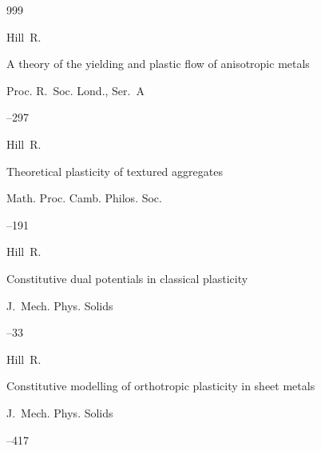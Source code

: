 \begin{thebibliography}{999}

\by  Hill~R. 

\paper A theory of the yielding and plastic flow of anisotropic metals

\jour Proc. R.~Soc. Lond., Ser.~A




--297






\by Hill~R. 

\paper Theoretical plasticity of textured aggregates

\jour  Math. Proc. Camb. Philos. Soc.




--191







\by Hill~R. 

\paper Constitutive dual potentials in classical plasticity

\jour  J.~Mech. Phys. Solids 




–33






\by Hill~R. 

\paper Constitutive modelling of orthotropic plasticity in sheet metals

\jour  J.~Mech. Phys. Solids 




–417


\end{thebibliography}
